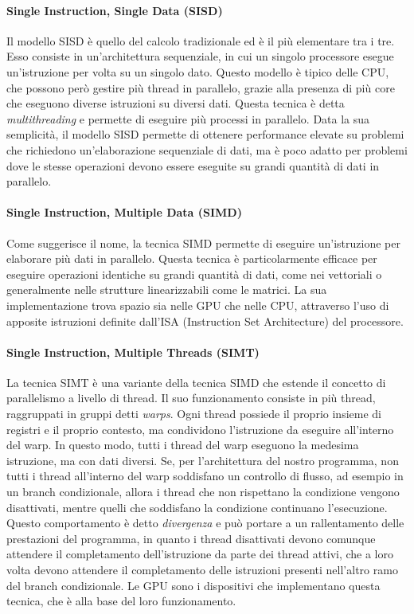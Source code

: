 \paragraph{Single Instruction, Single Data (SISD)}
\label{para:simd}

Il modello SISD è quello del calcolo tradizionale ed è il più elementare tra i tre.
Esso consiste in un'architettura sequenziale, in cui un singolo processore esegue
un'istruzione per volta su un singolo dato. Questo modello è tipico delle CPU, che
possono però gestire più thread in parallelo, grazie alla presenza di più core
che eseguono diverse istruzioni su diversi dati. Questa tecnica è detta \textit{multithreading}
e permette di eseguire più processi in parallelo. Data la sua semplicità, il
modello SISD permette di ottenere performance elevate su problemi che richiedono
un'elaborazione sequenziale di dati, ma è poco adatto per problemi dove le stesse
operazioni devono essere eseguite su grandi quantità di dati in parallelo.

\paragraph{Single Instruction, Multiple Data (SIMD)}
\label{para:simd}

Come suggerisce il nome, la tecnica SIMD permette di eseguire un'istruzione per
elaborare più dati in parallelo. Questa tecnica è particolarmente efficace per eseguire
operazioni identiche su grandi quantità di dati, come nei vettoriali o
generalmente nelle strutture linearizzabili come le matrici. La sua implementazione
trova spazio sia nelle GPU che nelle CPU, attraverso l'uso di apposite
istruzioni definite dall'ISA (Instruction Set Architecture) del processore.

\paragraph{Single Instruction, Multiple Threads (SIMT)\cite{generalpurposegpu}}
\label{para:simt}

La tecnica SIMT è una variante della tecnica SIMD che estende il concetto di
parallelismo a livello di thread. Il suo funzionamento consiste in più thread,
raggruppati in gruppi detti \textit{warps}. Ogni thread possiede il proprio
insieme di registri e il proprio contesto, ma condividono l'istruzione da eseguire
all'interno del warp. In questo modo, tutti i thread del warp eseguono la medesima
istruzione, ma con dati diversi. Se, per l'architettura del nostro programma, non
tutti i thread all'interno del warp soddisfano un controllo di flusso, ad
esempio in un branch condizionale, allora i thread che non rispettano la condizione
vengono disattivati, mentre quelli che soddisfano la condizione continuano l'esecuzione.
Questo comportamento è detto \textit{divergenza} e può portare a un
rallentamento delle prestazioni del programma, in quanto i thread disattivati devono
comunque attendere il completamento dell'istruzione da parte dei thread attivi,
che a loro volta devono attendere il completamento delle istruzioni presenti
nell'altro ramo del branch condizionale. Le GPU sono i dispositivi che implementano
questa tecnica, che è alla base del loro funzionamento.

